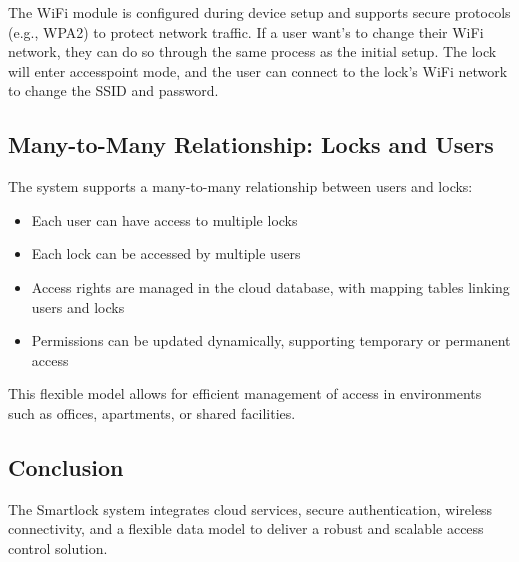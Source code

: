 The WiFi module is configured during device setup and supports secure protocols (e.g., WPA2) to protect network traffic. If a user want's to change their WiFi network, they can do so through the same process as the initial setup. The lock will enter accesspoint mode, and the user can connect to the lock's WiFi network to change the SSID and password.

\subsection{Many-to-Many Relationship: Locks and Users}
The system supports a many-to-many relationship between users and locks:
\begin{itemize}
    \item Each user can have access to multiple locks
    \item Each lock can be accessed by multiple users
    \item Access rights are managed in the cloud database, with mapping tables linking users and locks
    \item Permissions can be updated dynamically, supporting temporary or permanent access
\end{itemize}
This flexible model allows for efficient management of access in environments such as offices, apartments, or shared facilities.

\subsection{Conclusion}
The Smartlock system integrates cloud services, secure authentication, wireless connectivity, and a flexible data model to deliver a robust and scalable access control solution.
